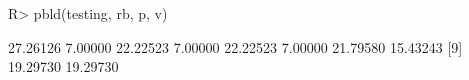 \begin{Schunk}
% --begin: "pbld6"
\begin{Sinput}
R> pbld(testing, rb, p, v)
\end{Sinput}
\begin{Soutput}
 [1] 27.26126  7.00000 22.22523  7.00000 22.22523  7.00000 21.79580 15.43243
 [9] 19.29730 19.29730
\end{Soutput}
%
% --end: "pbld6"
\end{Schunk}
